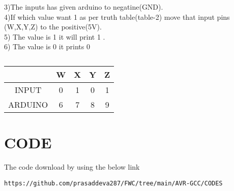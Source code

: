 \documentclass[journal,12pt,twocolumn]{IEEEtran}
\begin{document}
3)The inputs has given arduino to negatine(GND).
\\4)If  which value want 1 as per truth table(table-2) move that input pins (W,X,Y,Z) to the positive(5V).
\\5) The value is 1 it will print 1 .
\\6) The value is 0 it prints 0
\begin{table}
    \centering
    \begin{tabular}{|c|c|c|c|c|}
    \hline
         &W&X&Y&Z  \\
         \hline
         INPUT&0&1&0&1 \\
         \hline
         ARDUINO&6&7&8&9 \\
         \hline
    \end{tabular}
    \caption{}
\end{table}
\bigskip

\section{CODE}
The code download by using the below link
\begin{lstlisting}
https://github.com/prasaddeva287/FWC/tree/main/AVR-GCC/CODES
\end{lstlisting}
\end{document}
